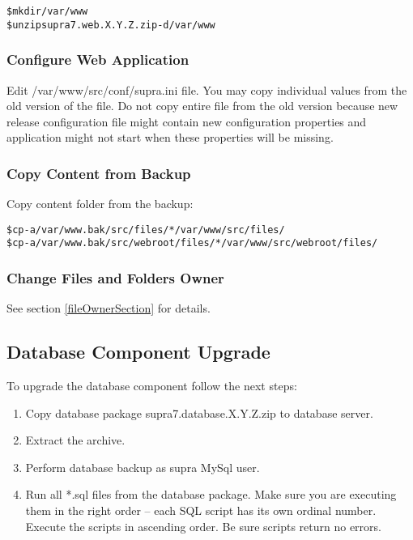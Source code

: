 \documentclass[12pt]{article}
\newcommand{\vigPackageName}{supra7}
\newcommand{\vigPathToProject}{/var/www}
\newcommand{\vigPathToSrc}{/src}
\begin{document}
\begin{alltt}
\$ mkdir \vigPathToProject
\$ unzip {\vigPackageName}.web.X.Y.Z.zip -d \vigPathToProject
\end{alltt}

\subsubsection{Configure Web Application}
Edit \textsf{\vigPathToProject\vigPathToSrc/conf/supra.ini} file. You may copy individual values from the old version of the file. Do not copy entire file from the old version because new release configuration file might contain new configuration properties and application might not start when these properties will be missing.

\subsubsection{Copy Content from Backup}
Copy content folder from the backup:

\begin{alltt}
\$ cp -a \vigPathToProject.bak\vigPathToSrc/files/* \vigPathToProject\vigPathToSrc/files/
\$ cp -a \vigPathToProject.bak\vigPathToSrc/webroot/files/* \vigPathToProject\vigPathToSrc/webroot/files/
\end{alltt}

\subsubsection{Change Files and Folders Owner}

See section \ref{fileOwnerSection} for details.

\subsection{Database Component Upgrade}
To upgrade the database component follow the next steps:

\begin{enumerate}
	\item Copy database package {\vigPackageName}.database.X.Y.Z.zip to database server.
	\item Extract the archive.
	\item Perform database backup as \textsf{supra} MySql user.
	\item Run all *.sql files from the database package. Make sure you are executing them in the right order -- each SQL script has its own ordinal number. Execute the scripts in ascending order. Be sure scripts return no errors.
\end{enumerate}
\end{document}

